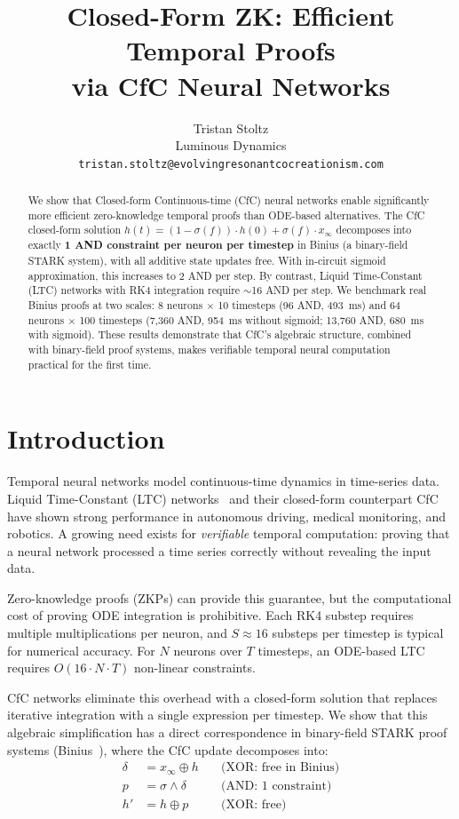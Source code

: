 \documentclass[11pt]{article}
\title{Closed-Form ZK: Efficient Temporal Proofs\\via CfC Neural Networks}
\author{
Tristan Stoltz\\
Luminous Dynamics\\
\texttt{tristan.stoltz@evolvingresonantcocreationism.com}
}
\begin{document}
\maketitle

\begin{abstract}
We show that Closed-form Continuous-time (CfC) neural networks enable significantly more efficient zero-knowledge temporal proofs than ODE-based alternatives. The CfC closed-form solution $h(t) = (1-\sigma(f)) \cdot h(0) + \sigma(f) \cdot x_\infty$ decomposes into exactly \textbf{1 AND constraint per neuron per timestep} in Binius (a binary-field STARK system), with all additive state updates free. With in-circuit sigmoid approximation, this increases to 2 AND per step. By contrast, Liquid Time-Constant (LTC) networks with RK4 integration require $\sim$16 AND per step. We benchmark real Binius proofs at two scales: 8 neurons $\times$ 10 timesteps (96 AND, 493~ms) and 64 neurons $\times$ 100 timesteps (7,360 AND, 954~ms without sigmoid; 13,760 AND, 680~ms with sigmoid). These results demonstrate that CfC's algebraic structure, combined with binary-field proof systems, makes verifiable temporal neural computation practical for the first time.
\end{abstract}

\section{Introduction}

Temporal neural networks model continuous-time dynamics in time-series data. Liquid Time-Constant (LTC) networks~\cite{hasani2021ltc} and their closed-form counterpart CfC~\cite{hasani2022cfc} have shown strong performance in autonomous driving, medical monitoring, and robotics. A growing need exists for \emph{verifiable} temporal computation: proving that a neural network processed a time series correctly without revealing the input data.

Zero-knowledge proofs (ZKPs) can provide this guarantee, but the computational cost of proving ODE integration is prohibitive. Each RK4 substep requires multiple multiplications per neuron, and $S \approx 16$ substeps per timestep is typical for numerical accuracy. For $N$ neurons over $T$ timesteps, an ODE-based LTC requires $O(16 \cdot N \cdot T)$ non-linear constraints.

CfC networks eliminate this overhead with a closed-form solution that replaces iterative integration with a single expression per timestep. We show that this algebraic simplification has a direct correspondence in binary-field STARK proof systems (Binius~\cite{diamond2023binius}), where the CfC update decomposes into:
\begin{align}
\delta &= x_\infty \oplus h \quad &\text{(XOR: free in Binius)} \\
p &= \sigma \wedge \delta \quad &\text{(AND: 1 constraint)} \\
h' &= h \oplus p \quad &\text{(XOR: free)}
\end{align}
\end{document}

